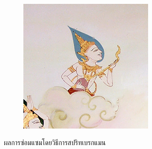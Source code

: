 \documentclass[xcolor=dvipsnames, xetex,serif]{beamer}
\numberwithin{equation}{section}
\begin{document}
\begin{frame}
\begin{figure}[H]
\begin{subfigure}{0.3\linewidth}
					\includegraphics[width=0.7\linewidth]{images/result_ex4/splitbergman_case05.png}			
				\end{subfigure}
				\caption{ผลการซ่อมแซมโดยวิธีการสปริทเบรกแมน}
			\end{figure}
		\end{frame}
\end{document}

